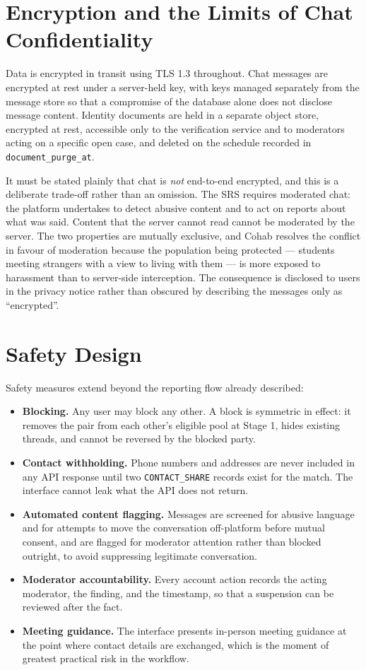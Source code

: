 \documentclass[12pt,a4paper]{report}
\begin{document}
\section{Encryption and the Limits of Chat Confidentiality}

Data is encrypted in transit using TLS 1.3 throughout. Chat messages are encrypted at rest under a server-held key, with keys managed separately from the message store so that a compromise of the database alone does not disclose message content. Identity documents are held in a separate object store, encrypted at rest, accessible only to the verification service and to moderators acting on a specific open case, and deleted on the schedule recorded in \texttt{document\_purge\_at}.

It must be stated plainly that chat is \emph{not} end-to-end encrypted, and this is a deliberate trade-off rather than an omission. The SRS requires moderated chat: the platform undertakes to detect abusive content and to act on reports about what was said. Content that the server cannot read cannot be moderated by the server. The two properties are mutually exclusive, and Cohab resolves the conflict in favour of moderation because the population being protected --- students meeting strangers with a view to living with them --- is more exposed to harassment than to server-side interception. The consequence is disclosed to users in the privacy notice rather than obscured by describing the messages only as ``encrypted''.

\section{Safety Design}

Safety measures extend beyond the reporting flow already described:

\begin{itemize}[noitemsep]
    \item \textbf{Blocking.} Any user may block any other. A block is symmetric in effect: it removes the pair from each other's eligible pool at Stage 1, hides existing threads, and cannot be reversed by the blocked party.
    \item \textbf{Contact withholding.} Phone numbers and addresses are never included in any API response until two \texttt{CONTACT\_SHARE} records exist for the match. The interface cannot leak what the API does not return.
    \item \textbf{Automated content flagging.} Messages are screened for abusive language and for attempts to move the conversation off-platform before mutual consent, and are flagged for moderator attention rather than blocked outright, to avoid suppressing legitimate conversation.
    \item \textbf{Moderator accountability.} Every account action records the acting moderator, the finding, and the timestamp, so that a suspension can be reviewed after the fact.
    \item \textbf{Meeting guidance.} The interface presents in-person meeting guidance at the point where contact details are exchanged, which is the moment of greatest practical risk in the workflow.
\end{itemize}
\end{document}
